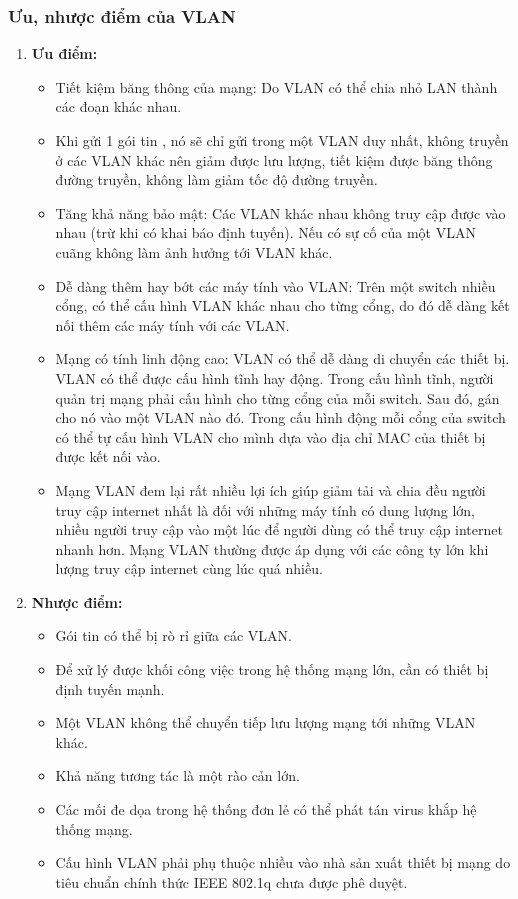 \documentclass[13pt]{article}
\begin{document}
\subsubsection{Ưu, nhược điểm của VLAN}
\begin{enumerate}
    \item \textbf{Ưu điểm:}
\begin{itemize}
    \item Tiết kiệm băng thông của mạng: Do VLAN có thể chia nhỏ LAN thành các đoạn khác nhau.
    \item Khi gửi 1 gói tin , nó sẽ chỉ gửi trong một VLAN duy nhất, không truyền ở các VLAN khác nên giảm được lưu lượng, tiết kiệm được băng thông đường truyền, không làm giảm tốc độ đường truyền.
    \item Tăng khả năng bảo mật: Các VLAN khác nhau không truy cập được vào nhau (trừ khi có khai báo định tuyến). Nếu có sự cố của một VLAN cuãng không làm ảnh hưởng tới VLAN khác.
    \item Dễ dàng thêm hay bớt các máy tính vào VLAN: Trên một switch nhiều cổng, có thể cấu hình VLAN khác nhau cho từng cổng, do đó dễ dàng kết nối thêm các máy tính với các VLAN.
    \item Mạng có tính linh động cao: VLAN có thể dễ dàng di chuyển các thiết bị. VLAN có thể được cấu hình tĩnh hay động. Trong cấu hình tĩnh, người quản trị mạng phải cấu hình cho từng cổng của mỗi switch. Sau đó, gán cho nó vào một VLAN nào đó. Trong cấu hình động mỗi cổng của switch có thể tự cấu hình VLAN cho mình dựa vào địa chỉ MAC của thiết bị được kết nối vào.
    \item Mạng VLAN đem lại rất nhiều lợi ích giúp giảm tải và chia đều người truy cập internet nhất là đối với những máy tính có dung lượng lớn, nhiều người truy cập vào một lúc để người dùng có thể truy cập internet nhanh hơn. Mạng VLAN thường được áp dụng với các công ty lớn khi lượng truy cập internet cùng lúc quá nhiều.
\end{itemize}

\item \textbf{Nhược điểm:}
\begin{itemize}
    \item Gói tin có thể bị rò rỉ giữa các VLAN.
    \item Để xử lý được khối công việc trong hệ thống mạng lớn, cần có thiết bị định tuyến mạnh.
    \item Một VLAN không thể chuyển tiếp lưu lượng mạng tới những VLAN khác.
    \item Khả năng tương tác là một rào cản lớn.
    \item Các mối đe dọa trong hệ thống đơn lẻ có thể phát tán virus khắp hệ thống mạng.
    \item Cấu hình VLAN phải phụ thuộc nhiều vào nhà sản xuất thiết bị mạng do tiêu chuẩn chính thức  IEEE 802.1q chưa được phê duyệt.
\end{itemize}
\end{enumerate}
\end{document}
